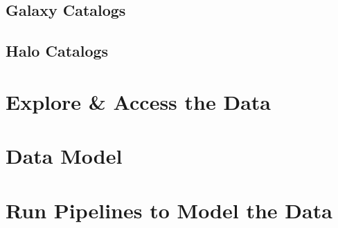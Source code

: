 \documentclass[12pt,letterpaper]{article}
\begin{document}
\subsection*{Galaxy Catalogs}

\subsection*{Halo Catalogs}


\section*{Explore \& Access the Data}


\section*{Data Model}


\section*{Run Pipelines to Model the Data}


\section*{}
\end{document}
